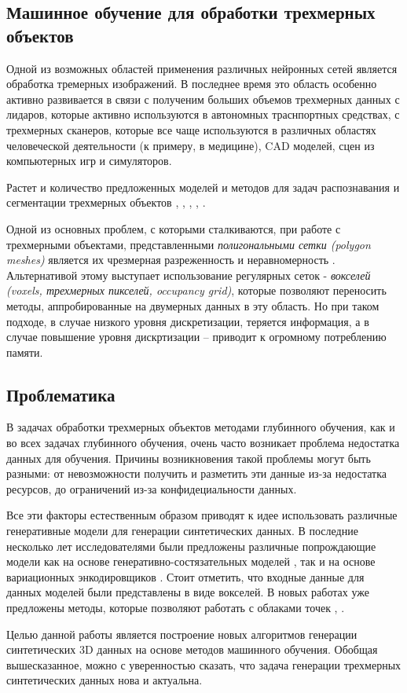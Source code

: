 \subsection{Машинное обучение для обработки трехмерных объектов}

Одной из возможных областей применения различных нейронных сетей является обработка тремерных изображений. В последнее время это область особенно активно развивается в связи с полученим больших объемов трехмерных данных с лидаров, которые активно используются в автономных траснпортных средствах, с трехмерных сканеров, которые все чаще используются в различных областях человеческой деятельности (к примеру, в медицине), CAD моделей, сцен из компьютерных игр и симуляторов.


Растет и количество предложенных моделей и методов для задач распознавания и сегментации трехмерных объектов \cite{point-net-plus}, \cite{seg-cloud}, \cite{octree-based}, \cite{spherical-conv-1}, \cite{spherical-cnn}.


Одной из основных проблем, с которыми сталкиваются, при работе с трехмерными объектами, представленными \textit{полигональными сетки (polygon meshes)} является их чрезмерная разреженность и неравномерность \cite{pu-net}. Альтернативой этому выступает использование регулярных сеток - \textit{вокселей (voxels, трехмерных пикселей, occupancy grid)}, которые позволяют переносить методы, аппробированные на двумерных данных в эту область. Но при таком подходе, в случае низкого уровня дискретизации, теряется информация, а в случае повышение уровня дискртизации -- приводит к огромному потреблению памяти. 


\subsection{Проблематика}

В задачах обработки трехмерных объектов методами глубинного обучения, как и во всех задачах глубинного обучения, очень часто возникает проблема недостатка данных для обучения. Причины возникновения такой проблемы могут быть разными: от невозможности получить и разметить эти данные из-за недостатка ресурсов, до ограничений из-за конфидециальности данных.

Все эти факторы естественным образом приводят к идее использовать различные генеративные модели для генерации синтетических данных. В последние несколько лет исследователями были предложены различные попрождающие модели как на основе генеративно-состязательных моделей \cite{3d-gan}, так и на основе вариационных энкодировщиков \cite{3d-autoencoder}. Стоит отметить, что входные данные для данных моделей были представлены в виде  вокселей. В новых работах уже предложены методы, которые позволяют работать с облаками точек \cite{adversarial-autoencoder}, \cite{lrgm-cloud}. 

Целью данной работы является построение новых алгоритмов генерации синтетических 3D данных на основе методов машинного обучения. Обобщая вышесказанное, можно с уверенностью сказать, что задача генерации трехмерных синтетических данных нова и актуальна. 